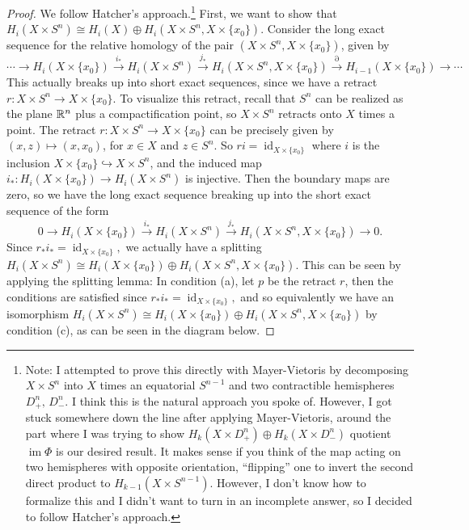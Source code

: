 \begin{proof}
    We follow Hatcher's approach.\footnote{Note: I attempted to prove this directly with Mayer-Vietoris by decomposing $X \times S^n $ into $X$ times an equatorial $S^{n-1}$ and two contractible hemispheres $D^n _+,\, D^n _-$. I think this is the natural approach you spoke of. However, I got stuck somewhere down the line after applying Mayer-Vietoris, around the part where I was trying to show $H_k(X\times D_+^n )\oplus H_k(X\times D_-^n )$ quotient $\operatorname{im}\Phi$ is our desired result. It makes sense if you think of the map acting on two hemispheres with opposite orientation, ``flipping'' one to invert the second direct product to $H_{k-1}(X\times S^{n-1})$. However, I don't know how to formalize this and I didn't want to turn in an incomplete answer, so I decided to follow Hatcher's approach.} First, we want to show that $H_i (X\times S^n )\cong H_i (X)\oplus H_i (X\times S^n , X\times \{x_0\} ) .$ Consider the long exact sequence for the relative homology of the pair $(X\times S^n ,X\times \{x_0\} )$, given by \[
        \cdots \to H_i (X \times \{x_0\} )\overset{i_*}{\longrightarrow} H_i (X\times S^n )\overset{j_*}{\longrightarrow} H_i (X\times S^n , X\times \{x_0\} )\overset{\partial }{\longrightarrow} H_{i-1}(X\times \{x_0\} )\to \cdots 
        \] This actually breaks up into short exact sequences, since we have a retract $r \colon X\times S^n \to X\times \{x_0\} $. To visualize this retract, recall that $S^n $ can be realized as the plane $\mathbb{R}^n $ plus a compactification point, so $X\times S^n $ retracts onto $X$ times a point. The retract $r \colon X\times S^n  \to X\times \{x_0\} $ can be precisely given by $(x,z) \mapsto (x, x_0)$, for $x\in X$ and $z\in S^n $. So $ri=\operatorname{id}_{X\times \{x_0\} }$ where $i$ is the inclusion $X\times \{x_0\} \hookrightarrow X\times S^n $, and the induced map $i_* \colon H_i (X\times \{x_0\} ) \to H_i (X\times S^n )$ is injective. Then the boundary maps are zero, so we have the long exact sequence breaking up into the short exact sequence of the form \[
    0 \to H_i (X\times \{x_0\} )\overset{i_*}{\longrightarrow} H_i (X\times S^n )\overset{j_*}{\longrightarrow} H_i (X\times S^n , X\times \{x_0\} )\to 0.
\] Since $r_*i_*=\operatorname{id}_{X\times \{x_0\} },$ we actually have a splitting $H_i (X\times S^n ) \cong H_i (X \times \{x_0\} ) \oplus H_i (X\times S^n , X\times \{x_0\} )$. This can be seen by applying the splitting lemma: In condition (a), let  $p$ be the retract $r$, then the conditions are satisfied since $r_*i_*=\operatorname{id}_{X\times \{x_0\} },$ and so equivalently we have an isomorphism $H_i (X\times S^n ) \cong H_i (X \times \{x_0\} ) \oplus H_i (X\times S^n , X\times \{x_0\} )$ by condition (c), as can be seen in the diagram below.

\end{proof}
